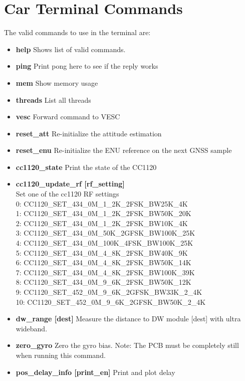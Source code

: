 \documentclass[12pt]{article} %
\begin{document}
\section{Car Terminal Commands} \label{sec:terminalcommands}
The valid commands to use in the terminal are: 
\begin{itemize} 
\item {\bf help} Shows list of valid commands. 
\item {\bf ping} Print pong here to see if the reply works
\item {\bf mem}  Show memory usage
\item {\bf threads} List all threads
\item {\bf vesc} Forward command to VESC
\item {\bf reset\_att} Re-initialize the attitude estimation
\item {\bf reset\_enu} Re-initialize the ENU reference on the next GNSS sample
\item {\bf cc1120\_state} Print the state of the CC1120
\item {\bf cc1120\_update\_rf [rf\_setting]}\\
  Set one of the cc1120 RF settings\\
  0: CC1120\_SET\_434\_0M\_1\_2K\_2FSK\_BW25K\_4K\\
  1: CC1120\_SET\_434\_0M\_1\_2K\_2FSK\_BW50K\_20K\\
  2: CC1120\_SET\_434\_0M\_1\_2K\_2FSK\_BW10K\_4K\\
  3: CC1120\_SET\_434\_0M\_50K\_2GFSK\_BW100K\_25K\\
  4: CC1120\_SET\_434\_0M\_100K\_4FSK\_BW100K\_25K\\
  5: CC1120\_SET\_434\_0M\_4\_8K\_2FSK\_BW40K\_9K\\
  6: CC1120\_SET\_434\_0M\_4\_8K\_2FSK\_BW50K\_14K\\
  7: CC1120\_SET\_434\_0M\_4\_8K\_2FSK\_BW100K\_39K\\
  8: CC1120\_SET\_434\_0M\_9\_6K\_2FSK\_BW50K\_12K\\
  9: CC1120\_SET\_452\_0M\_9\_6K\_2GFSK\_BW33K\_2\_4K\\
  10: CC1120\_SET\_452\_0M\_9\_6K\_2GFSK\_BW50K\_2\_4K
\item {\bf dw\_range [dest]} Measure the distance to DW module [dest]
  with ultra wideband.
\item {\bf zero\_gyro} Zero the gyro bias. Note: The PCB must be
  completely still when running this command.
\item {\bf pos\_delay\_info [print\_en]} Print and plot delay

\end{itemize}
\end{document}
